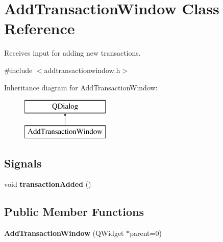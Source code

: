 \hypertarget{class_add_transaction_window}{}\section{Add\+Transaction\+Window Class Reference}
\label{class_add_transaction_window}


Receives input for adding new transactions.  




{\ttfamily \#include $<$addtransactionwindow.\+h$>$}

Inheritance diagram for Add\+Transaction\+Window\+:\begin{figure}[H]
\begin{center}
\leavevmode
\includegraphics[height=2.000000cm]{class_add_transaction_window}
\end{center}
\end{figure}
\subsection*{Signals}
\begin{DoxyCompactItemize}
\item 
\mbox{\label{class_add_transaction_window_a5ae9be23c731578feb170f42c2eceedd}} 
void {\bfseries transaction\+Added} ()
\end{DoxyCompactItemize}
\subsection*{Public Member Functions}
\begin{DoxyCompactItemize}
\item 
\mbox{\label{class_add_transaction_window_ae7f76cc31a2b9b44c0ede5a5a2408138}} 
{\bfseries Add\+Transaction\+Window} (Q\+Widget $\ast$parent=0)
\end{DoxyCompactItemize}
